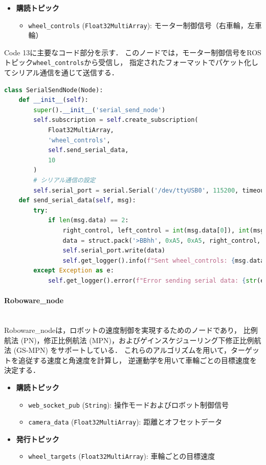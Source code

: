 \begin{itemize}
    \item \textbf{購読トピック}
          \begin{itemize}
              \item \texttt{wheel\_controls} (\texttt{Float32MultiArray}): モーター制御信号（右車輪，左車輪）
          \end{itemize}
\end{itemize}

Code 13に主要なコード部分を示す．
このノードでは，モーター制御信号をROSトピック\texttt{wheel\_controls}から受信し，
指定されたフォーマットでパケット化してシリアル通信を通じて送信する．
\newpage

\begin{lstlisting}[language=Python, caption=制御信号の送信 (serial\_send\_node.py)]
class SerialSendNode(Node):
    def __init__(self):
        super().__init__('serial_send_node')
        self.subscription = self.create_subscription(
            Float32MultiArray,
            'wheel_controls',
            self.send_serial_data,
            10
        )
        # シリアル通信の設定
        self.serial_port = serial.Serial('/dev/ttyUSB0', 115200, timeout=1)
    def send_serial_data(self, msg):
        try:
            if len(msg.data) == 2:
                right_control, left_control = int(msg.data[0]), int(msg.data[1])
                data = struct.pack('>BBhh', 0xA5, 0xA5, right_control, left_control)
                self.serial_port.write(data)
                self.get_logger().info(f"Sent wheel_controls: {msg.data}")
        except Exception as e:
            self.get_logger().error(f"Error sending serial data: {str(e)}")
\end{lstlisting}

\paragraph{Roboware\_node}\mbox{}\\
Roboware\_nodeは，ロボットの速度制御を実現するためのノードであり，
比例航法 (PN)，修正比例航法 (MPN)，およびゲインスケジューリング下修正比例航法 (GS-MPN)
をサポートしている．
これらのアルゴリズムを用いて，ターゲットを追従する速度と角速度を計算し，
逆運動学を用いて車輪ごとの目標速度を決定する．

\begin{itemize}
    \item \textbf{購読トピック}
          \begin{itemize}
              \item \texttt{web\_socket\_pub} (\texttt{String}): 操作モードおよびロボット制御信号
              \item \texttt{camera\_data} (\texttt{Float32MultiArray}): 距離とオフセットデータ
          \end{itemize}
    \item \textbf{発行トピック}
          \begin{itemize}
              \item \texttt{wheel\_targets} (\texttt{Float32MultiArray}): 車輪ごとの目標速度
          \end{itemize}
\end{itemize}

